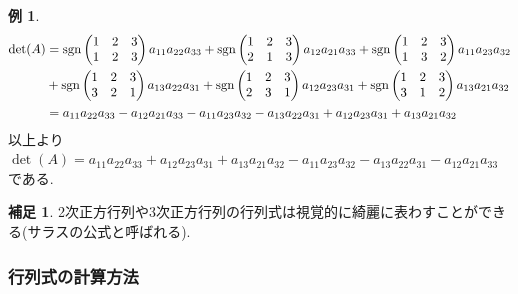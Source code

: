 \documentclass[dvipdfmx,a4paper,11pt]{article}
\newcommand{\sgn}{{\rm sgn}}
\theoremstyle{definition}
\newtheorem{exa}[thm]{例}
\newtheorem{rema}[thm]{補足}
\begin{document}
\begin{exa}
  \begin{align*}
  \det(A) 
  &= 
  \sgn \begin{pmatrix}
1& 2 &3\\
1& 2 &3\\
 \end{pmatrix}
 a_{11}a_{22}a_{33}
 +
   \sgn \begin{pmatrix}
1& 2 &3\\
2& 1 &3\\
 \end{pmatrix} 
 a_{12}a_{21}a_{33}
 +
\sgn \begin{pmatrix}
1& 2 &3\\
1& 3 &2\\
 \end{pmatrix} 
 a_{11}a_{23}a_{32} 
  \\%
  &+
\sgn  \begin{pmatrix}
1& 2 &3\\
3& 2 &1\\
 \end{pmatrix}
 a_{13}a_{22}a_{31} 
 +
\sgn  \begin{pmatrix}
1& 2 &3\\
2& 3 &1\\
 \end{pmatrix}
 a_{12}a_{23}a_{31} 
  +
\sgn   \begin{pmatrix}
1& 2 &3\\
3& 1 &2\\
 \end{pmatrix}
 a_{13}a_{21}a_{32} 
 \\%
   &= a_{11}a_{22}a_{33}- a_{12}a_{21}a_{33}- a_{11}a_{23}a_{32} 
   - a_{13}a_{22}a_{31}  + a_{12}a_{23}a_{31}  +  a_{13}a_{21}a_{32} 
  \end{align*}
  以上より
  $
 \det(A)= 
 a_{11}a_{22}a_{33}+ a_{12}a_{23}a_{31}  +  a_{13}a_{21}a_{32} 
- a_{11}a_{23}a_{32}     - a_{13}a_{22}a_{31}  - a_{12}a_{21}a_{33}
  $
  である.
\end{exa}
\begin{rema}
2次正方行列や3次正方行列の行列式は視覚的に綺麗に表わすことができる(サラスの公式と呼ばれる).
\end{rema}


\subsubsection{行列式の計算方法}
\end{document}
